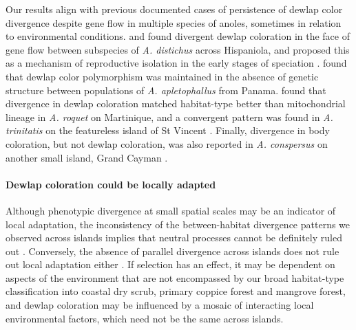 Our results align with previous documented cases of persistence of dewlap color divergence despite gene flow in multiple species of anoles, sometimes in relation to environmental conditions. \citet{Ng2012} and \citet{Ng2016} found divergent dewlap coloration in the face of gene flow between subspecies of \textit{A. distichus} across Hispaniola, and proposed this as a mechanism of reproductive isolation in the early stages of speciation \citep{Ng2011, Lambert2013, Ng2017}. \citet{Stapley2011} found that dewlap color polymorphism was maintained in the absence of genetic structure between populations of \textit{A. apletophallus} from Panama. \citet{Thorpe2002a} found that divergence in dewlap coloration matched habitat-type better than mitochondrial lineage in \textit{A. roquet} on Martinique, and a convergent pattern was found in \textit{A. trinitatis} on the featureless island of St Vincent \citep{Thorpe2002b}. Finally, divergence in body coloration, but not dewlap coloration, was also reported in \textit{A. conspersus} on another small island, Grand Cayman \citep{Macedonia2001}.\\

\paragraph{Dewlap coloration could be locally adapted} Although phenotypic divergence at small spatial scales may be an indicator of local adaptation, the inconsistency of the between-habitat divergence patterns we observed across islands implies that neutral processes cannot be definitely ruled out \citep{Losos2011}. Conversely, the absence of parallel divergence across islands does not rule out local adaptation either \citep{Losos2011}. If selection has an effect, it may be dependent on aspects of the environment that are not encompassed by our broad habitat-type classification into coastal dry scrub, primary coppice forest and mangrove forest, and dewlap coloration may be influenced by a mosaic of interacting local environmental factors, which need not be the same across islands.\\

